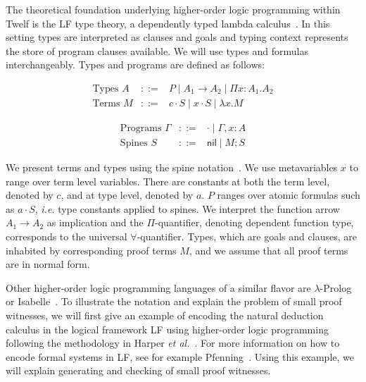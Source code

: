\documentclass{llncs}
\newcommand{\comb}{\cdot}
\newcommand{\nil}{\mathsf{nil}}
\begin{document}
The theoretical foundation underlying higher-order logic programming
within Twelf is the LF type theory, a dependently
typed lambda calculus~\cite{Pfenning91lf}. In this setting types are interpreted as
clauses and goals and typing context represents the store of program
clauses available. We will use types and formulas
interchangeably. Types and programs are defined as follows: 

\begin{minipage}[b]{6.5cm}
\[
\begin{array}{lcl}
\mbox{Types } A & ::= & P \mid  A_1 \rightarrow A_2 \mid \Pi x:A_1.A_2 \\
\mbox{Terms }  M & ::= & c \comb S \mid x \comb S \mid \lambda x. M  
\end{array}
\]
\end{minipage}
\begin{minipage}[b]{5cm}
\[
\begin{array}{lcl}
\mbox{Programs }  \Gamma & ::= & \cdot \mid \Gamma, x:A \\
\mbox{Spines } S & ::= & \nil \mid M ; S
\end{array}
\]
\end{minipage}

We present terms and types using the spine
notation~\cite{cervesato+:spine}. We use metavariables $x$ to range
over term level variables. There are constants at both the term level,
denoted by $c$, and at type level, denoted by $a$.  $P$ ranges over
atomic formulas such as $a \cdot S$, {\em i.e.} type constants applied
to spines. We interpret the function arrow $A_1 \rightarrow A_2$ as
implication and the $\Pi$-quantifier, denoting dependent function
type, corresponds to the universal $\forall$-quantifier. Types, which
are goals and clauses, are inhabited by corresponding proof terms $M$,
and we assume that all proof terms are in normal form.

Other higher-order logic programming languages of a similar flavor are
$\lambda$-Prolog~\cite{Nadathur99cade} or
Isabelle~\cite{Paulson86}. To illustrate the notation and explain the
problem of small proof witnesses, we will first give an example of
encoding the natural deduction calculus in the logical framework LF
using higher-order logic programming following the methodology in
Harper {\em et al.}~\cite{Harper93jacm}. For more information on how to
encode formal systems in LF, see for example
Pfenning~\cite{Pfenning97}.  Using this example, we will explain
generating and checking of small proof witnesses.
\end{document}
